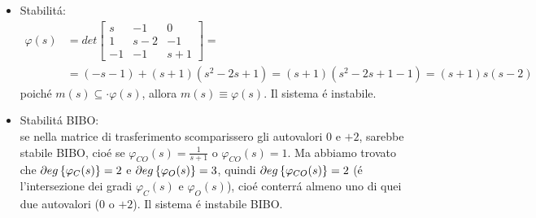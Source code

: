 \documentclass[../main.tex]{subfiles}
\begin{document}
\begin{mdframed}[style=Exercise]
\begin{Exercise}[title={Studiare propriet\'a di sistemi interconnessi}, difficulty=3]
\begin{enumerate}
\begin{itemize}
								Calcoliamo completamente $ Q $ per studiare l'osservabilit\'a da ogni singola uscita:
								\[
									Q=
									\begin{bmatrix}
										1 & 1 & 0\\
										0 & 1 & 0\\
										0 & 0 & 1\\
										\cline{1-3}\\
										-1 & 3 & 1\\
										-1 & 2 & 1\\
										1 & 1 & -1\\
										\cline{1-3}\\
										-2 & 6 & 2\\
										-1 & 4 & 1\\
										-2 & 2 & 2
									\end{bmatrix}
								\]
								Le prime righe di ogni sottomatrice non sono linearmente indipendenti, quindi il sistema non \'e completamente osservabile da $ y_1 $.\\
								Le seconde righe di ogni sottomatrice non sono linearmente indipendenti, quindi il sistema non \'e completamente osservabile da $ y_2 $.\\
								Le terze righe di ogni sottomatrice sono linearmente indipendenti(bisogna calcolare tutti i minori), quindi il sistema non \'e completamente osservabile da $ y_3 $.\\
							\item Stabilit\'a:
								\[
									\begin{aligned}
										\varphi(s) &= det
										\begin{bmatrix}
											s & -1 & 0\\
											1 & s-2 & -1\\
											-1 & -1 & s+1
										\end{bmatrix} =
										\\
										&= (-s-1)+(s+1)(s^2-2s+1) = (s+1)(s^2-2s+1-1) =(s+1)s(s-2)
									\end{aligned}
								\]
								poich\'e $ m(s) \subseteq\cdot \varphi(s) $, allora $ m(s) \equiv \varphi(s) $. Il sistema \'e instabile.
							\item Stabilit\'a BIBO:\\
								se nella matrice di trasferimento scomparissero gli autovalori $ 0 $ e $ +2 $, sarebbe stabile BIBO, cio\'e se $ \varphi_{CO}(s) = \frac{1}{s+1} $ o $ \varphi_{CO}(s) = 1 $. Ma abbiamo trovato che $ \partial eg \left\lbrace \varphi_C(s) \right\rbrace = 2 $ e $ \partial eg \left\lbrace \varphi_{O}(s) \right\rbrace = 3 $, quindi $ \partial eg \left\lbrace \varphi_{CO}(s) \right\rbrace = 2 $ (\'e l'intersezione dei gradi $ \varphi_C(s) $ e $ \varphi_O(s) $), cio\'e conterr\'a almeno uno di quei due autovalori ($ 0 $ o $ +2 $). Il sistema \'e instabile BIBO.
						\end{itemize}
				\end{enumerate}
			\end{Exercise}
		\end{mdframed}
	
\end{document}
